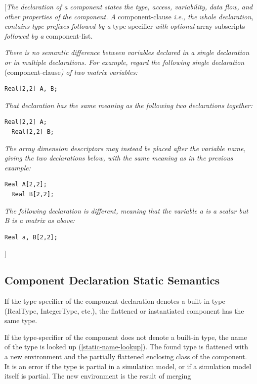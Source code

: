 \documentclass[10pt,a4paper]{report}
\def\doublelabel#1{\label{#1}\hypertarget{#1}{}}
\begin{document}
{[}\emph{The declaration of a component states the type, access,
variability, data flow, and other properties of the component. A}
component-clause \emph{i.e., the whole declaration}, \emph{contains type
prefixes followed by a} type-specifier \emph{with optional}
array-subscripts \emph{followed by a} component-list.

\emph{There is no semantic difference between variables declared in a
single declaration or in multiple declarations. For example, regard the
following single declaration} (component-clause\emph{) of two matrix
variables:}

\begin{lstlisting}[language=modelica]
  Real[2,2] A, B;
\end{lstlisting}
\emph{That declaration has the same meaning as the following two
declarations together:}

\begin{lstlisting}[language=modelica]
  Real[2,2] A;
  Real[2,2] B;
\end{lstlisting}
\emph{The array dimension descriptors may instead be placed after the
variable name, giving the two declarations below, with the same meaning
as in the previous example:}

\begin{lstlisting}[language=modelica]
  Real A[2,2];
  Real B[2,2];
\end{lstlisting}
\emph{The following declaration is different, meaning that the variable
a is a scalar but B is a matrix as above:}

\begin{lstlisting}[language=modelica]
  Real a, B[2,2];
\end{lstlisting}
{]}

\subsection{Component Declaration Static Semantics}\doublelabel{component-declaration-static-semantics}

If the type-specifier of the component declaration denotes a built-in
type (RealType, IntegerType, etc.), the flattened or instantiated
component has the same type.

If the type-specifier of the component does not denote a built-in type,
the name of the type is looked up (\ref{static-name-lookup}). The found type is
flattened with a new environment and the partially flattened enclosing
class of the component. It is an error if the type is partial in a
simulation model, or if a simulation model itself is partial. The new
environment is the result of merging
\end{document}
